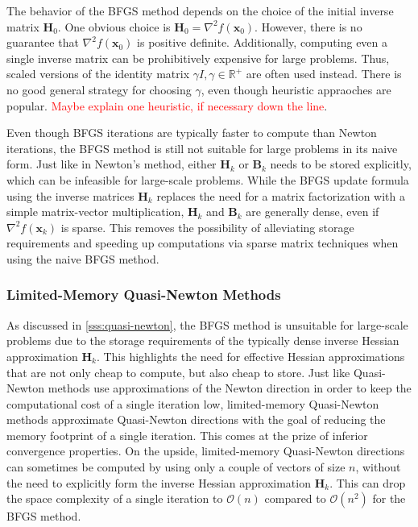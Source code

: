 The behavior of the BFGS method depends on the choice of the initial inverse matrix $\bm{H}_0$. One obvious choice is $\bm{H}_0 = \nabla^2 
f(\bm{x}_0)$. However, there is no guarantee that $\nabla^2 f(\bm{x}_0)$ is positive definite. Additionally, computing even a single inverse
matrix can be prohibitively expensive for large problems. Thus, scaled versions of the identity matrix $\gamma I, \gamma \in \mathbb{R}^+$ are
often used instead. There is no good general strategy for choosing $\gamma$, even though heuristic appraoches are popular. \textcolor{red}{Maybe
explain one heuristic, if necessary down the line}.

Even though BFGS iterations are typically faster to compute than Newton iterations, the BFGS method is still not suitable for large problems 
in its naive form. Just like in Newton's method, either $\bm{H}_k$ or $\bm{B}_k$ needs to be stored explicitly, which can be infeasible for 
large-scale problems. While the BFGS update formula using the inverse matrices $\bm{H}_k$ replaces the need for a matrix factorization with a simple 
matrix-vector multiplication, $\bm{H}_k$ and $\bm{B}_k$ are generally dense, even if $\nabla^2 f(\bm{x}_k)$ is sparse. This removes the possibility
of alleviating storage requirements and speeding up computations via sparse matrix techniques when using the naive BFGS method.

\subsubsection{Limited-Memory Quasi-Newton Methods}\label{sss:limited-memory-quasi-newton}
As discussed in \cref{sss:quasi-newton}, the BFGS method is unsuitable for large-scale problems due to the storage requirements of the 
typically dense inverse Hessian approximation $\bm{H}_k$. This highlights the need for effective Hessian approximations that are not only
cheap to compute, but also cheap to store. Just like Quasi-Newton methods use approximations of the Newton direction in order to keep 
the computational cost of a single iteration low, limited-memory Quasi-Newton methods approximate Quasi-Newton directions with 
the goal of reducing the memory footprint of a single iteration. This comes at the prize of inferior convergence properties. On the upside,
limited-memory Quasi-Newton directions can sometimes be computed by using only a couple of vectors of size $n$, without the need to 
explicitly form the inverse Hessian approximation $\bm{H}_k$. This can drop the space complexity of a single iteration to $\mathcal{O}(n)$ 
compared to $\mathcal{O}(n^2)$ for the BFGS method.

